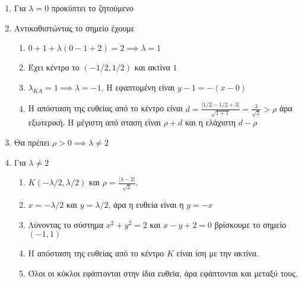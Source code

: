 \documentclass[12pt]{article}
\begin{document}
\begin{enumerate}
 \item Για $λ=0$ προκύπτει το ζητούμενο
 \item Αντικαθιστώντας το σημείο έχουμε
   \begin{enumerate}
    \item $0+1+λ(0-1+2)=2\implies λ=1$
    \item Έχει κέντρο το $(-1/2,1/2)$ και ακτίνα $1$
    \item $λ_{KA}=1\implies λ=-1$. Η εφαπτομένη είναι $y-1=-(x-0)$
    \item Η απόσταση της ευθείας από το κέντρο είναι $d=\frac{|1/2-1/2+3|}{\sqrt{1+1}}=\frac{3}{\sqrt{2}}>ρ$ άρα εξωτερική. Η μέγιστη από σταση είναι $ρ+d$ και η ελάχιστη $d-ρ$
   \end{enumerate}
 \item Θα πρέπει $ρ>0\implies λ\ne2$
 \item Για $λ\ne 2$
   \begin{enumerate}
      \item $K(-λ/2,λ/2)$ και $ρ=\frac{|λ-2|}{\sqrt{2}}$.
      \item $x=-λ/2$ και $y=λ/2$, άρα η ευθεία είναι η $y=-x$
      \item Λύνοντας το σύστημα $x^2+y^2=2$ και $x-y+2=0$ βρίσκουμε το σημείο $(-1,1)$
      \item Η απόσταση της ευθείας από το κέντρο $Κ$ είναι ίση με την ακτίνα.
      \item Όλοι οι κύκλοι εφάπτονται στην ίδια ευθεία, άρα εφάπτονται και μεταξύ τους.
   \end{enumerate}
\end{enumerate}
\end{document}
